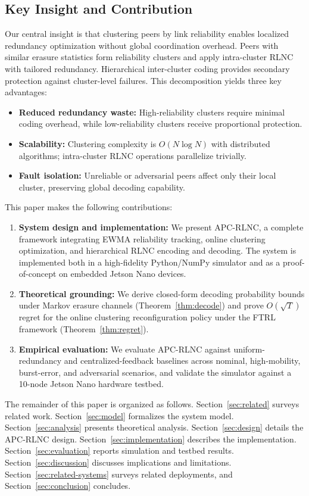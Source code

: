 \documentclass[journal]{IEEEtran}
\begin{document}
\subsection{Key Insight and Contribution}
Our central insight is that clustering peers by link reliability enables localized redundancy optimization without global coordination overhead. Peers with similar erasure statistics form reliability clusters and apply intra-cluster RLNC with tailored redundancy. Hierarchical inter-cluster coding provides secondary protection against cluster-level failures. This decomposition yields three key advantages:
\begin{itemize}
\item \textbf{Reduced redundancy waste:} High-reliability clusters require minimal coding overhead, while low-reliability clusters receive proportional protection.
\item \textbf{Scalability:} Clustering complexity is $O(N\log N)$ with distributed algorithms; intra-cluster RLNC operations parallelize trivially.
\item \textbf{Fault isolation:} Unreliable or adversarial peers affect only their local cluster, preserving global decoding capability.
\end{itemize}

This paper makes the following contributions:
\begin{enumerate}
\item \textbf{System design and implementation:} We present APC-RLNC, a complete framework integrating EWMA reliability tracking, online clustering optimization, and hierarchical RLNC encoding and decoding. The system is implemented both in a high-fidelity Python/NumPy simulator and as a proof-of-concept on embedded Jetson Nano devices.
\item \textbf{Theoretical grounding:} We derive closed-form decoding probability bounds under Markov erasure channels (Theorem~\ref{thm:decode}) and prove $O(\sqrt{T})$ regret for the online clustering reconfiguration policy under the FTRL framework (Theorem~\ref{thm:regret}).
\item \textbf{Empirical evaluation:} We evaluate APC-RLNC against uniform-redundancy and centralized-feedback baselines across nominal, high-mobility, burst-error, and adversarial scenarios, and validate the simulator against a 10-node Jetson Nano hardware testbed.
\end{enumerate}

The remainder of this paper is organized as follows. Section~\ref{sec:related} surveys related work. Section~\ref{sec:model} formalizes the system model. Section~\ref{sec:analysis} presents theoretical analysis. Section~\ref{sec:design} details the APC-RLNC design. Section~\ref{sec:implementation} describes the implementation. Section~\ref{sec:evaluation} reports simulation and testbed results. Section~\ref{sec:discussion} discusses implications and limitations. Section~\ref{sec:related-systems} surveys related deployments, and Section~\ref{sec:conclusion} concludes.
\end{document}
